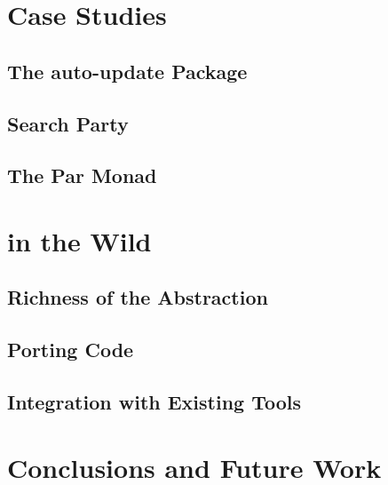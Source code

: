 \blindtext

\section{Case Studies}
\label{sec:dejafu-casestudies}

\blindtext

\subsection{The auto-update Package}
\subsection{Search Party}
\subsection{The Par Monad}

\section{\dejafu{} in the Wild}
\label{sec:dejafu-evaluation}

\blindtext

\subsection{Richness of the Abstraction}
\subsection{Porting Code}
\subsection{Integration with Existing Tools}

\section{Conclusions and Future Work}
\label{sec:dejafu-conclusions}

\blindtext
